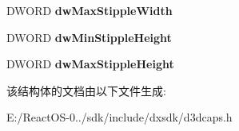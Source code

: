 \begin{DoxyCompactItemize}
\item 
\mbox{\label{struct___d3_d_device_desc2_a7545669e3967c76fc35f9a65e65cb647}} 
D\+W\+O\+RD {\bfseries dw\+Max\+Stipple\+Width}
\item 
\mbox{\label{struct___d3_d_device_desc2_a2a6a09329c55f5cc5e724d2b9caf9586}} 
D\+W\+O\+RD {\bfseries dw\+Min\+Stipple\+Height}
\item 
\mbox{\label{struct___d3_d_device_desc2_adb0e480187c4c444faa5c76dfc91ace8}} 
D\+W\+O\+RD {\bfseries dw\+Max\+Stipple\+Height}
\end{DoxyCompactItemize}


该结构体的文档由以下文件生成\+:\begin{DoxyCompactItemize}
\item 
E\+:/\+React\+O\+S-\/0../sdk/include/dxsdk/d3dcaps.\+h\end{DoxyCompactItemize}
